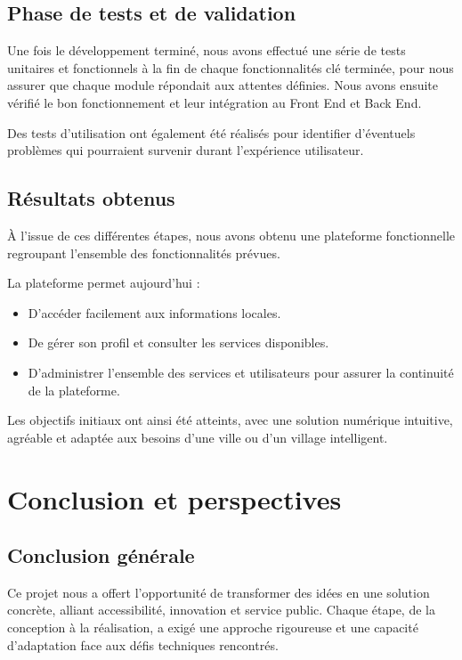 \documentclass[a4paper,12pt]{report}
\begin{document}
	\subsection{Phase de tests et de validation}
	Une fois le développement terminé, nous avons effectué une série de tests unitaires et fonctionnels à la fin de chaque fonctionnalités clé terminée, pour nous assurer que chaque module répondait aux attentes définies. Nous avons ensuite vérifié le bon fonctionnement et leur intégration au Front End et Back End.
	
	Des tests d'utilisation ont également été réalisés pour identifier d'éventuels problèmes qui pourraient survenir durant l'expérience utilisateur.
	
	\subsection{Résultats obtenus}
	À l'issue de ces différentes étapes, nous avons obtenu une plateforme fonctionnelle regroupant l'ensemble des fonctionnalités prévues.
	
	La plateforme permet aujourd'hui :
	\begin{itemize}
		\item D'accéder facilement aux informations locales.
		\item De gérer son profil et consulter les services disponibles.
		\item D'administrer l'ensemble des services et utilisateurs pour assurer la continuité de la plateforme.
	\end{itemize}
	
	Les objectifs initiaux ont ainsi été atteints, avec une solution numérique intuitive, agréable et adaptée aux besoins d'une ville ou d'un village intelligent.
	
	\newpage
	
	\section{Conclusion et perspectives}
	
	\subsection{Conclusion générale}
	
	Ce projet nous a offert l'opportunité de transformer des idées en une solution concrète, alliant accessibilité, innovation et service public. Chaque étape, de la conception à la réalisation, a exigé une approche rigoureuse et une capacité d'adaptation face aux défis techniques rencontrés.
	
\end{document}
